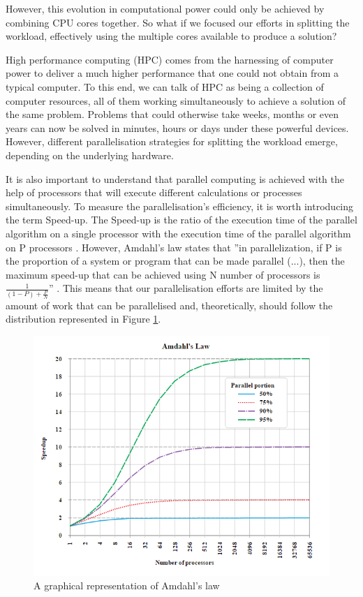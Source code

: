 \documentclass[12pt, openany]{book}
\begin{document}
However, this evolution in computational power could only be achieved by combining CPU cores together.
So what if we focused our efforts in splitting the workload, effectively using the multiple cores available to produce a solution?\par
High performance computing (HPC) comes from the harnessing of computer power to deliver a much higher performance that one could not obtain from a typical computer. To this end, we can talk of HPC as being a collection of computer resources, all of them working simultaneously to achieve a solution of the same problem. Problems that could otherwise take weeks, months or even years can now be solved in minutes, hours or days under these powerful devices. However, different parallelisation strategies for splitting the workload emerge, depending on the underlying hardware. \par
It is also important to understand that parallel computing is achieved with the help of processors that will execute different calculations or processes simultaneously. To measure the parallelisation's efficiency, it is worth introducing the term Speed-up. The Speed-up is the ratio of the execution time of the parallel algorithm on a single processor with the execution time of the parallel algorithm on P processors \cite{irenehpc}. However, Amdahl's law states that ''in parallelization, if P is the proportion of a system or program that can be made parallel (...), then the maximum speed-up that can be achieved using N number of processors is $\frac{1}{\left(1-P\right)+\frac{P}{N}}$'' \cite{amdahl}. This means that our parallelisation efforts are limited by the amount of work that can be parallelised and, theoretically, should follow the distribution represented in Figure \ref{fig:amdahl}. 

\begin{figure}[H]
\centering
  \includegraphics[width=0.6\linewidth]{Resources/Images/amdahl.png}
  \caption{A graphical representation of Amdahl's law}
  \label{fig:amdahl}
\end{figure}
\end{document}
